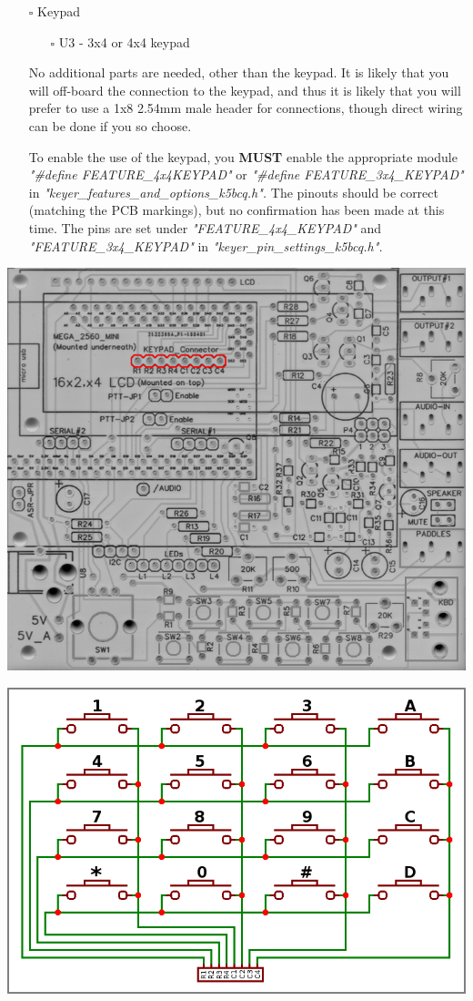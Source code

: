 \documentclass[11pt]{article}
\begin{document}
\newpage
\begin{itemize}
\item[{$\square$}] Keypad
\begin{itemize}
\item[{$\square$}] U3 - 3x4 or 4x4 keypad
\end{itemize}

No additional parts are needed, other than the keypad.  It is likely that you will off-board the connection to the keypad, and thus it is likely that you will prefer to use a 1x8 2.54mm male header for connections, though direct wiring can be done if you so choose.

To enable the use of the keypad, you \textbf{MUST} enable the appropriate module \emph{"\#define FEATURE\_4x4KEYPAD"} or \emph{"\#define FEATURE\_3x4\_KEYPAD"} in \emph{"keyer\_features\_and\_options\_k5bcq.h".}  The pinouts should be correct (matching the PCB markings), but no confirmation has been made at this time.  The pins are set under \emph{"FEATURE\_4x4\_KEYPAD"} and \emph{"FEATURE\_3x4\_KEYPAD"} in \emph{"keyer\_pin\_settings\_k5bcq.h".}
\end{itemize}
\begin{center}
\includegraphics[width=.9\linewidth]{../png/3.2/pcb-top-3x4-keypad.png}
\end{center}
\begin{center}
\includegraphics[width=.9\linewidth]{../png/3.2/keypad_layout.png}
\end{center}
\end{document}
